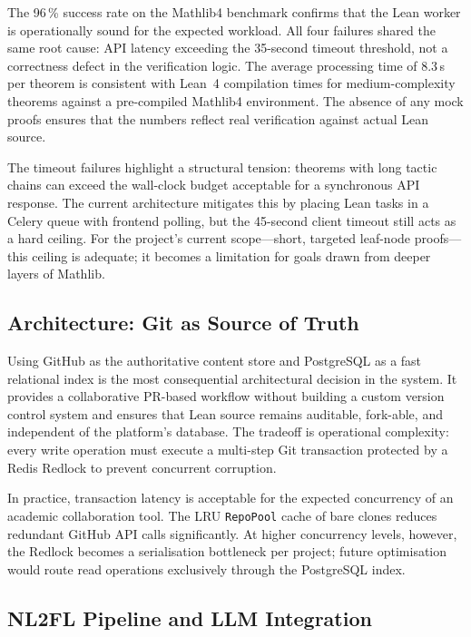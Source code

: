 \documentclass[conference]{IEEEtran}
\begin{document}
The 96\,\% success rate on the Mathlib4 benchmark confirms that the Lean
worker is operationally sound for the expected workload. All four failures
shared the same root cause: API latency exceeding the 35-second timeout
threshold, not a correctness defect in the verification logic. The average
processing time of 8.3\,s per theorem is consistent with Lean~4 compilation
times for medium-complexity theorems against a pre-compiled Mathlib4
environment. The absence of any mock proofs ensures that the numbers reflect
real verification against actual Lean source.

The timeout failures highlight a structural tension: theorems with long
tactic chains can exceed the wall-clock budget acceptable for a synchronous
API response. The current architecture mitigates this by placing Lean tasks
in a Celery queue with frontend polling, but the 45-second client timeout
still acts as a hard ceiling. For the project's current scope---short,
targeted leaf-node proofs---this ceiling is adequate; it becomes a
limitation for goals drawn from deeper layers of Mathlib.

\subsection{Architecture: Git as Source of Truth}
\label{subsec:disc-git}

Using GitHub as the authoritative content store and PostgreSQL as a fast
relational index is the most consequential architectural decision in the
system. It provides a collaborative PR-based workflow without building a
custom version control system and ensures that Lean source remains
auditable, fork-able, and independent of the platform's database. The
tradeoff is operational complexity: every write operation must execute a
multi-step Git transaction protected by a Redis Redlock to prevent
concurrent corruption.

In practice, transaction latency is acceptable for the expected concurrency
of an academic collaboration tool. The LRU \texttt{RepoPool} cache of bare
clones reduces redundant GitHub API calls significantly. At higher
concurrency levels, however, the Redlock becomes a serialisation bottleneck
per project; future optimisation would route read operations exclusively
through the PostgreSQL index.

\subsection{NL2FL Pipeline and LLM Integration}
\label{subsec:disc-nl2fl}
\end{document}
